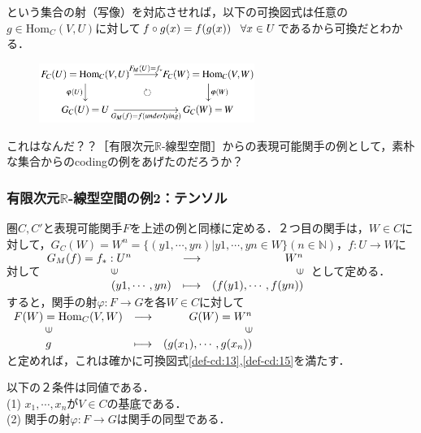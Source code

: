 \documentclass[uplatex, 12pt, a4paper, dvipdfmx]{jsarticle}
\begin{document}
という集合の射（写像）を対応させれば，以下の可換図式は任意の$g\in \mathrm{Hom}_C(V,U)$に対して$f\circ g(x) = f(g(x)) \hspace{3mm}\forall x\in U$であるから可換だとわかる．
\begin{figure}[ht]\begin{center}\includegraphics[width=7cm]{cd-15-2.png}\end{center}\end{figure}
これはなんだ？？［有限次元$\mathbb{R}$-線型空間］からの表現可能関手の例として，素朴な集合からのcodingの例をあげたのだろうか？

\subsubsection{有限次元$\mathbb{R}$-線型空間の例2：テンソル}
圏$C,C'$と表現可能関手$F$を上述の例と同様に定める．２つ目の関手は，$W\in C$に対して，$G_C(W)=W^n=\{ (y1,\cdots, yn) | y1,\cdots, yn\in W \} (n\in\mathbb{N})$，$f:U\longrightarrow W$に対して$\begin{array}{lcr}G_M(f)=f_*:U^n & \longrightarrow & W^n \\ \hspace{2cm} \rotatebox{90}{$\in$} & & \rotatebox{90}{$\in$} \\ \hspace{2cm} (y1, \cdots, yn) & \longmapsto & (f(y1), \cdots, f(yn))  \end{array}$として定める．\\
すると，関手の射$\varphi :F\longrightarrow G$を各$W\in C$に対して\\ $\begin{array}{lcr} F(W)=\mathrm{Hom}_C(V,W)&\longrightarrow & G(W)=W^n \\ \hspace{1cm} \rotatebox{90}{$\in$} & & \rotatebox{90}{$\in$} \\ \hspace{1cm} g & \longmapsto & (g(x_1),\cdots, g(x_n)) \end{array}$\\
と定めれば，これは確かに可換図式\ref{def-cd:13},\ref{def-cd:15}を満たす．

\begin{shadebox}\begin{proposition}
    以下の２条件は同値である．\\
    (1)\; $x_1,\cdots,x_n$が$V\in C$の基底である．\\
    (2)\; 関手の射$\varphi :F\longrightarrow G$は関手の同型である．
\end{proposition}\end{shadebox}
\end{document}
